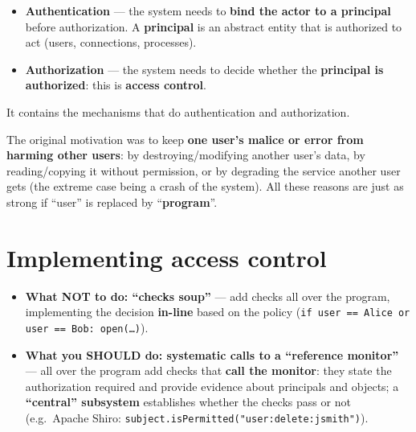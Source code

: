 \begin{defnbox}[title=Authentication vs.\ authorization]
\begin{itemize}
  \item \textbf{Authentication} --- the system needs to \textbf{bind the actor to a
        principal} before authorization. A \textbf{principal} is an abstract entity
        that is authorized to act (users, connections, processes).
  \item \textbf{Authorization} --- the system needs to decide whether the
        \textbf{principal is authorized}: this is \textbf{access control}.
\end{itemize}
\end{defnbox}

\begin{warnbox}[title=Trusted Computing Base (TCB)]
It contains the mechanisms that do authentication and authorization.
\end{warnbox}

\begin{rembox}[title={Origin of protection mechanisms (Lampson, 1971)}]
The original motivation was to keep \textbf{one user's malice or error from harming other
users}: by destroying/modifying another user's data, by reading/copying it without
permission, or by degrading the service another user gets (the extreme case being a
crash of the system). All these reasons are just as strong if ``user'' is replaced by
``\textbf{program}''.
\end{rembox}

\section{Implementing access control}

\begin{propbox}[title={``Checks soup'' vs.\ reference monitor}]
\begin{itemize}
  \item \textbf{What NOT to do: ``checks soup''} --- add checks all over the program,
        implementing the decision \textbf{in-line} based on the policy
        (\texttt{if user == Alice or user == Bob: open(\ldots)}).
  \item \textbf{What you SHOULD do: systematic calls to a ``reference monitor''} ---
        all over the program add checks that \textbf{call the monitor}: they state the
        authorization required and provide evidence about principals and objects; a
        \textbf{``central'' subsystem} establishes whether the checks pass or not
        (e.g.\ Apache Shiro: \texttt{subject.isPermitted("user:delete:jsmith")}).
\end{itemize}
\end{propbox}

